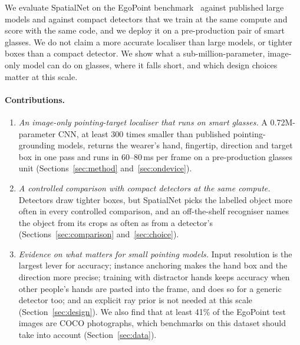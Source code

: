We evaluate SpatialNet on the EgoPoint benchmark~\cite{egopoint} against published large models and against compact detectors that we train at the same compute and score with the same code, and we deploy it on a pre-production pair of smart glasses. We do not claim a more accurate localiser than large models, or tighter boxes than a compact detector. We show what a sub-million-parameter, image-only model can do on glasses, where it falls short, and which design choices matter at this scale.

\paragraph{Contributions.}
\begin{enumerate}
\item \emph{An image-only pointing-target localiser that runs on smart glasses.} A 0.72M-parameter CNN, at least 300 times smaller than published pointing-grounding models, returns the wearer's hand, fingertip, direction and target box in one pass and runs in 60--80\,ms per frame on a pre-production glasses unit (Sections~\ref{sec:method} and~\ref{sec:ondevice}).
\item \emph{A controlled comparison with compact detectors at the same compute.} Detectors draw tighter boxes, but SpatialNet picks the labelled object more often in every controlled comparison, and an off-the-shelf recogniser names the object from its crops as often as from a detector's (Sections~\ref{sec:comparison} and~\ref{sec:choice}).
\item \emph{Evidence on what matters for small pointing models.} Input resolution is the largest lever for accuracy; instance anchoring makes the hand box and the direction more precise; training with distractor hands keeps accuracy when other people's hands are pasted into the frame, and does so for a generic detector too; and an explicit ray prior is not needed at this scale (Section~\ref{sec:design}). We also find that at least 41\% of the EgoPoint test images are COCO photographs, which benchmarks on this dataset should take into account (Section~\ref{sec:data}).
\end{enumerate}
